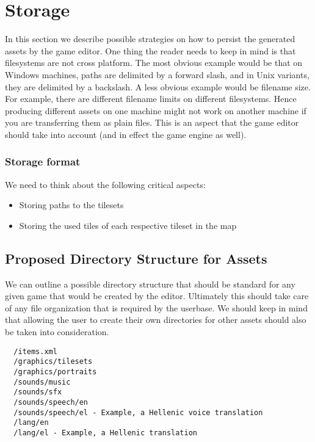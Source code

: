 \section{Storage}

In this section we describe possible strategies on how to persist the generated
assets by the game editor. One thing the reader needs to keep in mind is that
filesystems are not cross platform. The most obvious example would be that on
Windows machines, paths are delimited by a forward slash, and in Unix variants,
they are delimited by a backslash. A less obvious example would be filename
size. For example, there are different filename limits on different filesystems.
Hence producing different assets on one machine might not work on another
machine if you are transferring them as plain files. This is an aspect that the
game editor should take into account (and in effect the game engine as well).

\subsubsection{Storage format}

We need to think about the following critical aspects:

\begin{itemize}
\item Storing paths to the tilesets
\item Storing the used tiles of each respective tileset in the map
\end{itemize}

\subsection{Proposed Directory Structure for Assets}

We can outline a possible directory structure that should be standard for any
given game that would be created by the editor. Ultimately this should take
care of any file organization that is required by the userbase. We should keep
in mind that allowing the user to create their own directories for other assets
should also be taken into consideration.

\begin{lstlisting}
  /items.xml
  /graphics/tilesets
  /graphics/portraits
  /sounds/music
  /sounds/sfx
  /sounds/speech/en
  /sounds/speech/el - Example, a Hellenic voice translation
  /lang/en
  /lang/el - Example, a Hellenic translation
\end{lstlisting}

